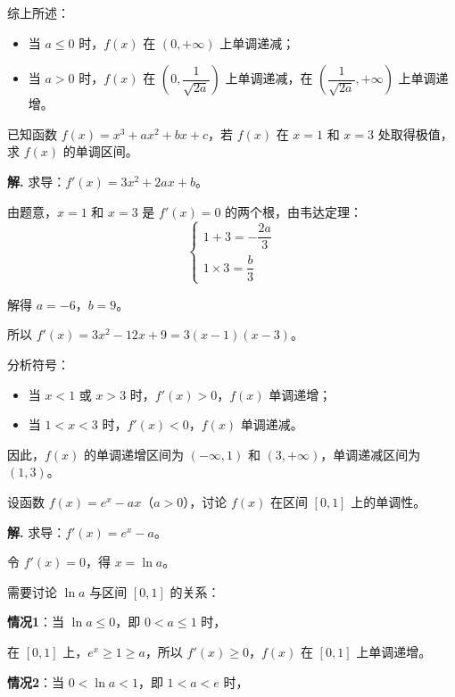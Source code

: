 \documentclass[11pt]{ctexrep}
\begin{document}
综上所述：
\begin{itemize}
    \item 当 $a \le 0$ 时，$f(x)$ 在 $(0, +\infty)$ 上单调递减；
    \item 当 $a > 0$ 时，$f(x)$ 在 $\left(0, \dfrac{1}{\sqrt{2a}}\right)$ 上单调递减，在 $\left(\dfrac{1}{\sqrt{2a}}, +\infty\right)$ 上单调递增。
\end{itemize}

\begin{realexam}[2023 上海秋考]
    已知函数 $f(x) = x^3 + ax^2 + bx + c$，若 $f(x)$ 在 $x = 1$ 和 $x = 3$ 处取得极值，求 $f(x)$ 的单调区间。
\end{realexam}

\textbf{解.} 求导：$f'(x) = 3x^2 + 2ax + b$。

由题意，$x = 1$ 和 $x = 3$ 是 $f'(x) = 0$ 的两个根，由韦达定理：
\[
    \begin{cases}
        1 + 3 = -\dfrac{2a}{3} \\[6pt]
        1 \times 3 = \dfrac{b}{3}
    \end{cases}
\]

解得 $a = -6$，$b = 9$。

所以 $f'(x) = 3x^2 - 12x + 9 = 3(x - 1)(x - 3)$。

分析符号：
\begin{itemize}
    \item 当 $x < 1$ 或 $x > 3$ 时，$f'(x) > 0$，$f(x)$ 单调递增；
    \item 当 $1 < x < 3$ 时，$f'(x) < 0$，$f(x)$ 单调递减。
\end{itemize}

因此，$f(x)$ 的单调递增区间为 $(-\infty, 1)$ 和 $(3, +\infty)$，单调递减区间为 $(1, 3)$。

\begin{realexam}[2025 上海二模]
    设函数 $f(x) = e^x - ax$（$a > 0$），讨论 $f(x)$ 在区间 $[0, 1]$ 上的单调性。
\end{realexam}

\textbf{解.} 求导：$f'(x) = e^x - a$。

令 $f'(x) = 0$，得 $x = \ln a$。

需要讨论 $\ln a$ 与区间 $[0, 1]$ 的关系：

\textbf{情况1}：当 $\ln a \le 0$，即 $0 < a \le 1$ 时，

在 $[0, 1]$ 上，$e^x \ge 1 \ge a$，所以 $f'(x) \ge 0$，$f(x)$ 在 $[0, 1]$ 上单调递增。

\textbf{情况2}：当 $0 < \ln a < 1$，即 $1 < a < e$ 时，
\end{document}
